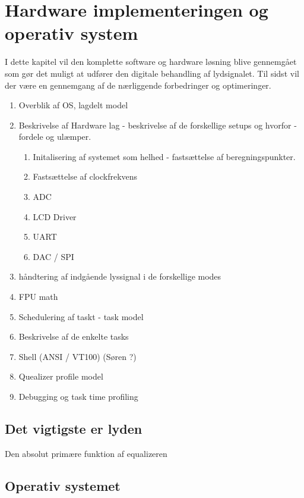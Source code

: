 \chapter{Hardware implementeringen og operativ system}\label{kap:hardware}

I dette kapitel vil den komplette software og hardware løsning blive gennemgået som gør det muligt at udfører den digitale behandling af lydsignalet.
Til sidst vil der være en gennemgang af de nærliggende forbedringer og optimeringer.


\begin{enumerate}
	\item Overblik af OS, lagdelt model
	\item Beskrivelse af Hardware lag - beskrivelse af de forskellige setups og hvorfor - fordele og ulæmper.
	\begin{enumerate}
		\item Initalisering af systemet som helhed - fastsættelse af beregningspunkter.
		\item Fastsættelse af clockfrekvens
		\item ADC
		\item LCD Driver 
		\item UART
		\item DAC / SPI
	\end{enumerate}
	\item håndtering af indgående lyssignal i de forskellige modes
	\item FPU math
	\item Schedulering af taskt - task model 
	\item Beskrivelse af de enkelte tasks
	\item Shell (ANSI / VT100) (Søren ?) 
	\item Quealizer profile model
	\item Debugging og task time profiling
	
\end{enumerate}

\section{Det vigtigste er lyden}
Den absolut primære funktion af equalizeren    



\section{Operativ systemet}

